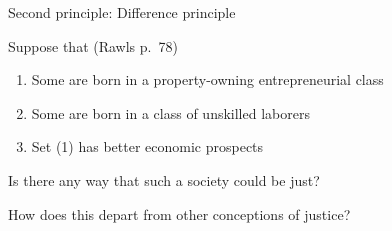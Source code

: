\documentclass{beamer}
\begin{document}
\begin{frame}{Second principle: Difference principle} \pause

Suppose that \hfill (Rawls p.~78)
\begin{enumerate}
\item Some are born in a property-owning entrepreneurial class
\item Some are born in a class of unskilled laborers \pause
\item Set (1) has better economic prospects \pause
\end{enumerate}
Is there any way that such a society could be just? %


\end{frame}


\begin{frame}
How does this depart from other conceptions of justice?
\end{frame}
\end{document}
